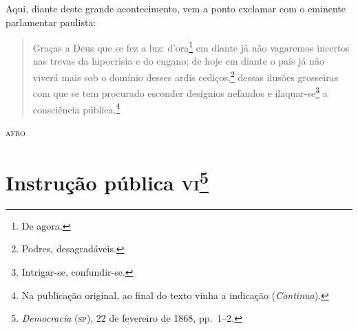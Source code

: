 Aqui, diante deste grande acontecimento, vem a ponto exclamar com o
eminente parlamentar paulista:

\begin{quote}
Graças a Deus que se fez a luz: d'ora\footnote{De agora.} em diante
já não vagaremos incertos nas trevas da hipocrisia e do engano; de hoje
em diante o país já não viverá mais sob o domínio desses ardis
cediços,\footnote{Podres, desagradáveis.} dessas ilusões grosseiras
com que se tem procurado esconder desígnios nefandos e
ilaquar-se\footnote{Intrigar-se, confundir-se.} a consciência
pública.\footnote{Na publicação original, ao final do texto vinha a indicação (\emph{Continua}).}
\end{quote}

\begin{flushright}
\textsc{afro}
\end{flushright}

\chapter{Instrução pública \textsc{vi}\footnote{\emph{Democracia} (\textsc{sp}),
  22 de fevereiro de 1868, pp.~1--2.}} %

